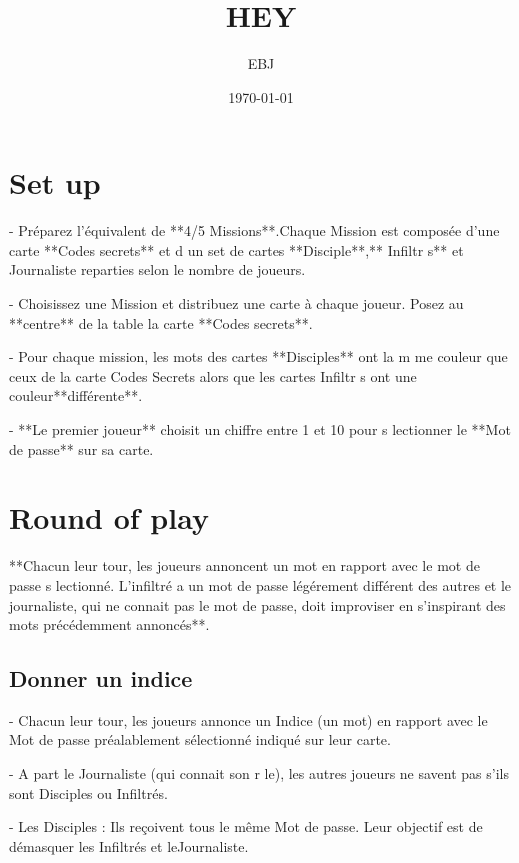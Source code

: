\documentclass{article}%
\title{HEY}%
\author{EBJ}%
\date{\today}%
\begin{document}
%
\pagestyle{empty}%
\normalsize%
\maketitle%
\section{ Set up
}%
\label{sec:Setup}%

%
{-} Préparez l'équivalent de **4/5 Missions**.Chaque Mission est composée d'une carte **Codes secrets** et d un set de cartes **Disciple**,** Infiltr s** et Journaliste reparties selon le nombre de joueurs.
%

%
{-} Choisissez une Mission et distribuez une carte à chaque joueur. Posez au **centre** de la table la carte **Codes secrets**.
%

%
{-} Pour chaque mission, les mots des cartes **Disciples** ont la m me couleur que ceux de la carte Codes Secrets alors que les cartes Infiltr s ont une couleur**différente**.
%

%
{-} **Le premier joueur** choisit un chiffre entre 1 et 10 pour s lectionner le **Mot de passe** sur sa carte.
%



%
\section{ Round of play
}%
\label{sec:Roundofplay}%

%
**Chacun leur tour, les joueurs annoncent un mot en rapport avec le mot de passe s lectionné. L'infiltré a un mot de passe légérement différent des autres et le journaliste, qui ne connait pas le mot de passe, doit improviser en s'inspirant des mots précédemment annoncés**.
%



%
\subsection{ Donner un indice
}%
\label{subsec:Donnerunindice}%

%
{-} Chacun leur tour, les joueurs annonce un Indice (un mot) en rapport avec le Mot de passe préalablement sélectionné indiqué sur leur carte.
%

%
{-} A part le Journaliste (qui connait son r le), les autres joueurs ne savent pas s'ils sont Disciples ou Infiltrés.
%

%
{-} Les Disciples : Ils reçoivent tous le même Mot de passe. Leur objectif est de démasquer les Infiltrés et leJournaliste.
%
\end{document}
